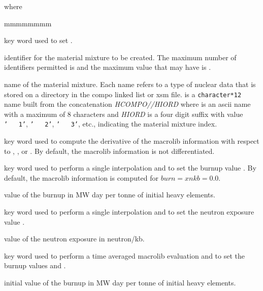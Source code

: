 \goodbreak
\noindent where
\begin{ListeDeDescription}{mmmmmmmm}

\item[\moc{MIX}] key word used to set .

\item[\dusa{matnum}] identifier for the material mixture to be created. The maximum number of identifiers permitted is  and the maximum value that  may have is .

\item[\dusa{HTYPE}] name of the material mixture. Each name refers to a type of nuclear data that is stored on a directory in the {\sc compo} linked list or {\sc xsm} file.  is a {\tt character*12} name built from the concatenation {\sl HCOMPO//HIORD} where  is an {\sc ascii} name with a maximum of 8 characters and {\sl HIORD} is a four digit suffix with value {\tt '~~~1'}, {\tt '~~~2'}, {\tt '~~~3'}, etc., indicating the material mixture index.

\item[\moc{DERIV}] key word used to compute the derivative of the {\sc macrolib} information with respect to , ,  or . By default, the {\sc macrolib} information is not differentiated.

\item[\moc{BURNUP}] key word used to perform a single interpolation and to set the burnup value . By default, the {\sc macrolib} information is computed for $burn=xnkb=0.0$.

\item[\dusa{burn}] value of the burnup in MW day per tonne of initial heavy elements.

\item[\moc{N/KB}] key word used to perform a single interpolation and to set the neutron exposure value .

\item[\dusa{xnkb}] value of the neutron exposure in neutron/kb.

\item[\moc{T-BURNUP}] key word used to perform a time averaged {\sc macrolib} evaluation and to set the burnup values  and .

\item[\dusa{burn0}] initial value of the burnup in MW day per tonne of initial heavy elements.


\end{ListeDeDescription}
